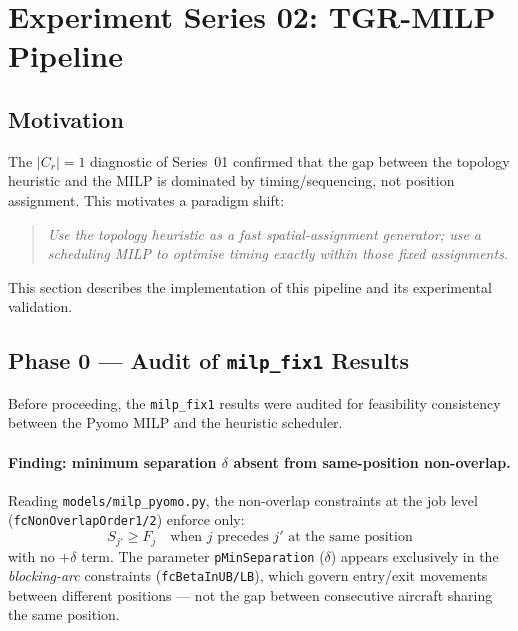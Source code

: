 \section{Experiment Series 02: TGR-MILP Pipeline}
\label{sec:exp02}

\subsection{Motivation}

The $|C_r|=1$ diagnostic of Series~01 confirmed that the gap between the
topology heuristic and the MILP is dominated by timing/sequencing, not position
assignment.  This motivates a paradigm shift:

\begin{quote}
\emph{Use the topology heuristic as a fast spatial-assignment generator;
use a scheduling MILP to optimise timing exactly within those fixed assignments.}
\end{quote}

This section describes the implementation of this pipeline and its experimental
validation.

\subsection{Phase 0 — Audit of \texttt{milp\_fix1} Results}

Before proceeding, the \texttt{milp\_fix1} results were audited for feasibility
consistency between the Pyomo MILP and the heuristic scheduler.

\paragraph{Finding: minimum separation $\delta$ absent from same-position non-overlap.}

Reading \texttt{models/milp\_pyomo.py}, the non-overlap constraints at the
job level (\texttt{fcNonOverlapOrder1/2}) enforce only:
\[
    S_{j'} \geq F_j \quad \text{when } j \text{ precedes } j' \text{ at the same position}
\]
with no $+\delta$ term.  The parameter \texttt{pMinSeparation} ($\delta$) appears
exclusively in the \emph{blocking-arc} constraints (\texttt{fcBetaInUB/LB}), which
govern entry/exit movements between different positions — not the gap between
consecutive aircraft sharing the same position.

